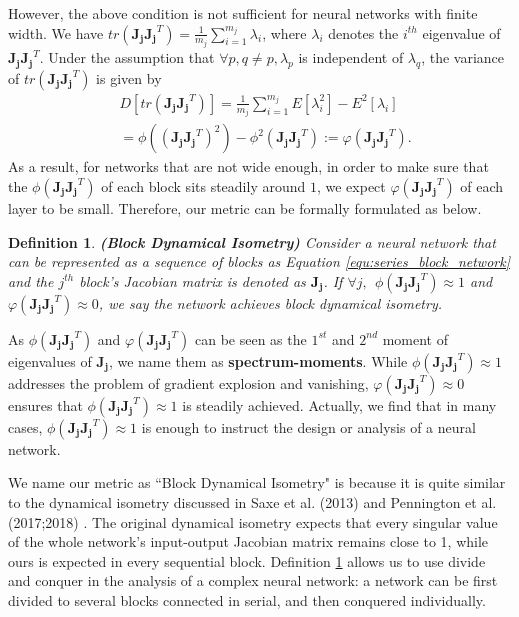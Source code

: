 \documentclass[10pt,journal,compsoc]{IEEEtran}
\newcommand{\modify}[1]{{ #1}}
\newtheorem{definition}{Definition}[section]
\begin{document}
However, the above condition is not sufficient for neural networks with finite width. We have $tr\left(\mathbf{J_jJ_j}^T\right)=\frac{1}{m_j}\sum_{i=1}^{m_j}\lambda_i$, where $\lambda_i$ denotes the $i^{th}$ eigenvalue of $\mathbf{J_jJ_j}^T$. Under the assumption that $\forall p,q\neq p, \lambda_p$ is independent of $\lambda_q$, the variance of $tr(\mathbf{J_jJ_j}^T)$ is given by
\begin{equation}
\begin{split}
    &D[tr(\mathbf{J_jJ_j}^T)] = \frac{1}{m_j}\sum_{i=1}^{m_j}E[\lambda_i^2]-E^2[\lambda_i]\\
    & = \phi\left(\left(\mathbf{J_jJ_j}^T\right)^2\right) - \phi^2\left(\mathbf{J_jJ_j}^T\right):=\varphi\left(\mathbf{J_jJ_j}^T\right).
\end{split}
\end{equation}
As a result, for networks that are not wide enough, in order to make sure that the $\phi(\mathbf{J_jJ_j}^T)$ of each block sits steadily around $1$, we expect $\varphi(\mathbf{J_jJ_j}^T)$ of each layer to be small. Therefore, our metric can be formally formulated as below.

\begin{definition}
\textbf{(Block Dynamical Isometry) }Consider a neural network that can be represented as a sequence of blocks as Equation \eqref{equ:series_block_network} and the $j^{th}$ block's Jacobian matrix is denoted as $\mathbf{J_j}$. If $\forall j,~~\phi(\mathbf{J_jJ_j}^T)\approx1$ and $\varphi(\mathbf{J_jJ_j}^T)\approx 0$, we say the network achieves block dynamical isometry.
\label{def:block_dynamical_isometry}
\end{definition}
\modify{As $\phi(\mathbf{J_jJ_j}^T)$ and $\varphi(\mathbf{J_jJ_j}^T)$ can be seen as the $1^{st}$ and $2^{nd}$ moment of eigenvalues of $\mathbf{J_j}$, we name them as \textbf{spectrum-moments}.}
While $\phi(\mathbf{J_jJ_j}^T)\approx 1$ addresses the problem of gradient explosion and vanishing, $\varphi(\mathbf{J_jJ_j}^T)\approx 0$ ensures that $\phi(\mathbf{J_jJ_j}^T)\approx 1$ is steadily achieved. Actually, we find that in many cases, $\phi(\mathbf{J_jJ_j}^T)\approx 1$ is enough to instruct the design or analysis of a neural network.

We name our metric as ``Block Dynamical Isometry" is because it is quite similar to the dynamical isometry discussed in Saxe et al. (2013) \cite{saxe2013exact} and Pennington et al. (2017;2018) \cite{pennington2017resurrecting,pennington2018emergence}. The original dynamical isometry expects that every singular value of the whole network's input-output Jacobian matrix remains close to 1, while ours is expected in every sequential block. Definition \ref{def:block_dynamical_isometry} allows us to use divide and conquer in the analysis of a complex neural network: a network can be first divided to several blocks connected in serial, and then conquered individually.
 
\end{document}
